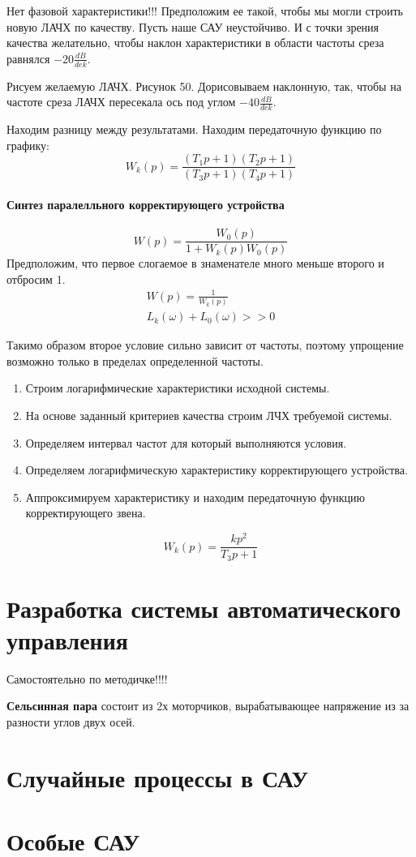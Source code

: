 Нет фазовой характеристики!!! Предположим ее такой, чтобы мы могли строить новую ЛАЧХ по качеству. Пусть наше САУ неустойчиво. И с точки зрения качества желательно, чтобы наклон характеристики в области частоты среза равнялся $-20\frac{dB}{dek}$.

Рисуем желаемую ЛАЧХ. Рисунок 50. Дорисовываем наклонную, так, чтобы на частоте среза ЛАЧХ пересекала ось под углом $-40\frac{dB}{dek}$. 

Находим разницу между результатами. Находим передаточную функцию по графику:
$$
	W_k(p)=\frac{(T_1p+1)(T_2p+1)}{(T_3p+1)(T_4p+1)}
$$
\paragraph{Синтез паралелльного корректирующего устройства}
$$
	W(p)=\frac{W_0(p)}{1+W_k(p)W_0(p)}
$$
Предположим, что первое слогаемое в знаменателе много меньше второго и отбросим 1.
\begin{align*}
	W(p)=\frac1{W_k(p)} \\
	L_k(\omega)+L_0(\omega)>>0
\end{align*}

Такимо образом второе условие сильно зависит от частоты, поэтому упрощение возможно только в пределах определенной частоты.
\begin{enumerate}
	\item Строим логарифмические характеристики исходной системы.
	\item На основе заданный критериев качества строим ЛЧХ требуемой системы.
	\item Определяем интервал частот для который выполняются условия.
	\item Определяем логарифмическую характеристику корректирующего устройства.
	\item Аппроксимируем характеристику и находим передаточную функцию корректирующего звена.
\end{enumerate}
$$
	W_k(p)=\frac{kp^2}{T_3p+1}
$$
\section{Разработка системы автоматического управления}
Самостоятельно по методичке!!!!

\textbf{Сельсинная пара} состоит из 2х моторчиков, вырабатывающее напряжение из за разности углов двух осей.
\section{Случайные процессы в САУ}
\section{Особые САУ}